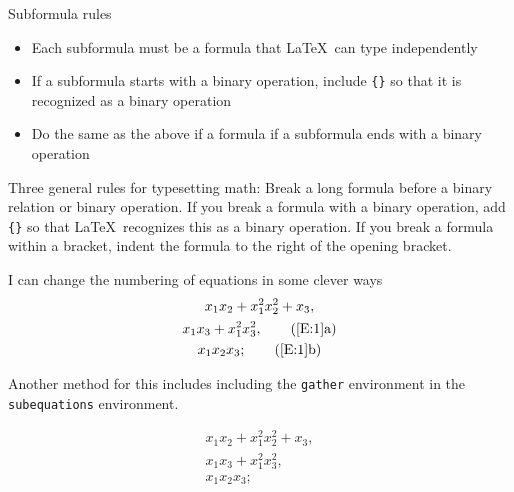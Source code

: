 \documentclass[12pt]{amsart}
\begin{document}
Subformula rules 
\begin{itemize}
   \item Each subformula must be a formula that \LaTeX \ can type independently
   \item If a subformula starts with a binary operation, include \verb+{}+ so that it is recognized as a binary operation
   \item Do the same as the above if a formula if a subformula ends with a binary operation
\end{itemize}
Three general rules for typesetting math: Break a long formula before a binary relation or binary operation. If you break a formula with a binary operation, add \verb+{}+ so that \LaTeX \ recognizes this as a binary operation. If you break a formula within a bracket, indent the formula to the right of the opening bracket. 

I can change the numbering of equations in some clever ways
\begin{gather}
   x_{1} x_{2} + x_{1}^{2} x_{2}^{2} + x_{3}, 
   \label{E:1} \\
   x_{1} x_{3} + x_{1}^{2} x_{3}^{2},
   \tag{\ref{E:1}a}\\
   x_{1} x_{2} x_{3}; \tag{\ref{E:1}b}
\end{gather}

Another method for this includes including the \texttt{gather} environment in the \texttt{subequations} environment. 

\begin{subequations} \label{E:gp}
   \begin{gather}
       x_{1} x_{2} + x_{1}^{2} x_{2}^{2} + x_{3}, 
       \label{E:gp1} \\
       x_{1} x_{3} + x_{1}^{2} x_{3}^{2},
      \label{E:gp2}\\
      x_{1} x_{2} x_{3}; \label{E:gp2}
   \end{gather}
\end{subequations}
\vspace{15 pt}
\end{document}
